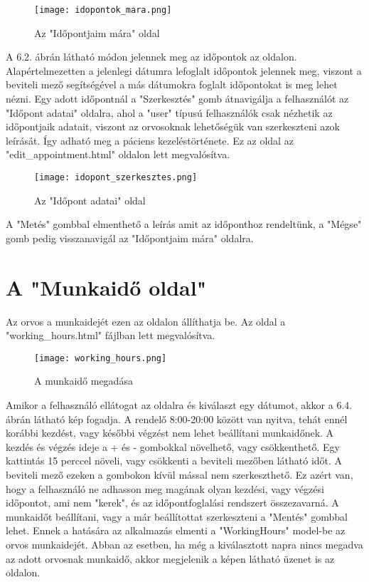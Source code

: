 \begin{figure}[!htbp]
	\caption{Az "Időpontjaim mára" oldal}
	\label{fig:idopontjaimmara}
	\centering
	\texttt{[image: idopontok\_mara.png]}
\end{figure}

A 6.2. ábrán látható módon jelennek meg az időpontok az oldalon. Alapértelmezetten a jelenlegi dátumra lefoglalt időpontok jelennek meg, viszont a beviteli mező segítségével a más dátumokra foglalt időpontokat is meg lehet nézni. Egy adott időpontnál a "Szerkesztés" gomb átnavigálja a felhasználót az "Időpont adatai" oldalra, ahol a "user" típusú felhasználók csak nézhetik az időpontjaik adatait, viszont az orvosoknak lehetőségük van szerkeszteni azok leírását. Így adható meg a páciens kezeléstörténete. Ez az oldal az "edit\_appointment.html" oldalon lett megvalósítva.

\begin{figure}[!htbp]
	\caption{Az "Időpont adatai" oldal}
	\label{fig:idopontadatai}
	\centering
	\texttt{[image: idopont\_szerkesztes.png]}
\end{figure}

A "Metés" gombbal elmenthető a leírás amit az időponthoz rendeltünk, a "Mégse" gomb pedig visszanavigál az "Időpontjaim mára" oldalra.

\section{A "Munkaidő oldal"}

Az orvos a munkaidejét ezen az oldalon állíthatja be. Az oldal a "working\_hours.html" fájlban lett megvalósítva.

\begin{figure}[!htbp]
	\caption{A munkaidő megadása}
	\label{fig:munkaidomegadasa}
	\centering
	\texttt{[image: working\_hours.png]}
\end{figure}

Amikor a felhasználó ellátogat az oldalra és kiválaszt egy dátumot, akkor a 6.4. ábrán látható kép fogadja. A rendelő 8:00-20:00 között van nyitva, tehát ennél korábbi kezdést, vagy későbbi végzést nem lehet beállítani munkaidőnek. A kezdés és végzés ideje a + és - gombokkal növelhető, vagy csökkenthető. Egy kattintás 15 perccel növeli, vagy csökkenti a beviteli mezőben látható időt. A beviteli mező ezeken a gombokon kívül mással nem szerkeszthető. Ez azért van, hogy a felhasználó ne adhasson meg magának olyan kezdési, vagy végzési időpontot, ami nem "kerek", és az időpontfoglalási rendszert összezavarná. A munkaidőt beállítani, vagy a már beállítottat szerkeszteni a "Mentés" gombbal lehet. Ennek a hatására az alkalmazás elmenti a "WorkingHours" model-be az orvos munkaidejét. Abban az esetben, ha még a kiválasztott napra nincs megadva az adott orvosnak munkaidő, akkor megjelenik a képen látható üzenet is az oldalon.

